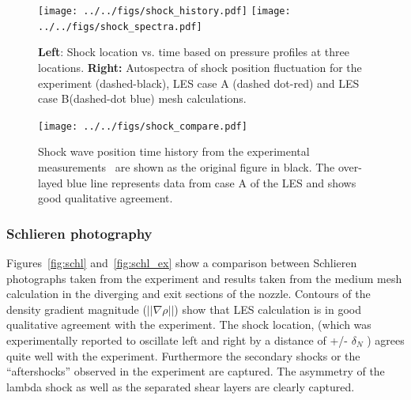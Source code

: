 \documentclass[]{aiaa-tc}%
\begin{document}


\begin{figure}[!h]%
	\centering
	\texttt{[image: ../../figs/shock\_history.pdf]}
	\texttt{[image: ../../figs/shock\_spectra.pdf]}
 	\caption{ {\bf Left}: Shock location vs. time based on pressure profiles at three locations. {\bf Right:} Autospectra of shock position fluctuation for the experiment (dashed-black), LES case A (dashed dot-red) and LES case B(dashed-dot blue) mesh calculations. }
 	\label{fig:shock_history}
\end{figure}


\begin{figure}[!h]
	\begin{centering}
	\texttt{[image: ../../figs/shock\_compare.pdf]}
	\caption{ Shock wave position time history from the experimental measurements~\cite{Papam:10} are shown as the original figure in black.  The over-layed blue line represents data from case A of the LES and shows good qualitative agreement.
 	\label{fig:shock_compare}
	}
	\end{centering}
\end{figure}



\subsubsection{Schlieren photography}


Figures~\ref{fig:schl} and~\ref{fig:schl_ex} show a comparison between Schlieren photographs taken from the experiment and results taken from the medium mesh calculation in the diverging and exit sections of the nozzle.  Contours of the density gradient magnitude ($||\nabla\rho|| $) show that LES calculation is in good qualitative agreement with the experiment.  The shock location, (which was experimentally reported to oscillate left and right by a distance of +/- $\delta_N$ ) agrees quite well with the experiment.  Furthermore the secondary shocks or the ``aftershocks'' observed in the experiment are captured.  The asymmetry of the lambda shock as well as the separated shear layers are clearly captured.


\end{document}
